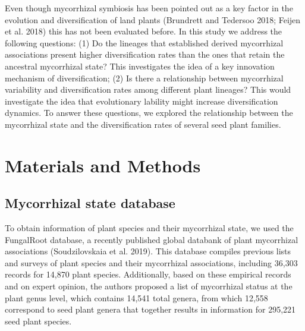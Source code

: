 \documentclass[12pt,]{article}
\begin{document}
Even though mycorrhizal symbiosis has been pointed out as a key factor
in the evolution and diversification of land plants (Brundrett and
Tedersoo 2018; Feijen et al. 2018) this has not been evaluated before.
In this study we address the following questions: (1) Do the lineages
that established derived mycorrhizal associations present higher
diversification rates than the ones that retain the ancestral
mycorrhizal state? This investigates the idea of a key innovation
mechanism of diversification; (2) Is there a relationship between
mycorrhizal variability and diversification rates among different plant
lineages? This would investigate the idea that evolutionary lability
might increase diversification dynamics. To answer these questions, we
explored the relationship between the mycorrhizal state and the
diversification rates of several seed plant families.

\hypertarget{materials-and-methods}{%
\section{Materials and Methods}\label{materials-and-methods}}

\hypertarget{mycorrhizal-state-database}{%
\subsection{Mycorrhizal state
database}\label{mycorrhizal-state-database}}

To obtain information of plant species and their mycorrhizal state, we
used the FungalRoot database, a recently published global databank of
plant mycorrhizal associations (Soudzilovskaia et al. 2019). This
database compiles previous lists and surveys of plant species and their
mycorrhizal associations, including 36,303 records for 14,870 plant
species. Additionally, based on these empirical records and on expert
opinion, the authors proposed a list of mycorrhizal status at the plant
genus level, which contains 14,541 total genera, from which 12,558
correspond to seed plant genera that together results in information for
295,221 seed plant species.
\end{document}
